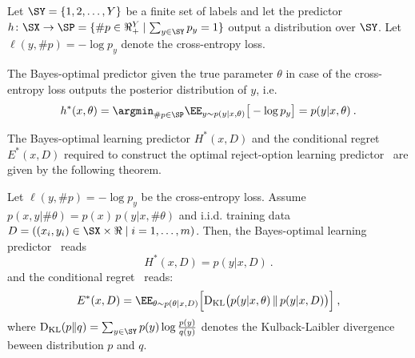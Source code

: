 Let $\SY=\{1,2,\ldots,Y\}$ be a finite set of labels and let the predictor $h\colon\SX\rightarrow \SP=\{\#p\in\Re_+^Y\mid \sum_{y\in\SY}p_y=1\}$ output a distribution over $\SY$. Let $\ell(y,\#p)=-\log p_y$ denote the cross-entropy loss. 

The Bayes-optimal predictor given the true parameter $\theta$ in case of the cross-entropy loss outputs the posterior distribution of $y$, i.e.
\[
   h^*(x,\theta) = \argmin_{\#p\in\SP} \EE_{y\sim p(y|x,\theta)} \big [-\log p_y \big ] = p(y|x,\theta) \:.
\]
%

The Bayes-optimal learning predictor $H^*(x,D)$ and the conditional regret $E^*(x,D)$ required to construct the optimal reject-option learning predictor~ are given by the following theorem.

\begin{theorem}
Let $\ell(y,\#p)=-\log p_y$ be the cross-entropy loss. 
Assume $p(x,y|\#\theta)=p(x)\,p(y|x,\#\theta)$ and i.i.d. training data $D=((x_i,y_i)\in\SX\times\Re\mid i=1,\ldots,m)$. Then, the Bayes-optimal learning predictor~ reads
\[
   H^*(x,D) = p(y|x,D)\:.
\]
and the conditional regret~ reads:
\begin{equation}
  \label{equ:CondRegretEntropy}
   E^*(x,D) = \EE_{\theta\sim p(\theta|x,D)} \Big [{\rm D}_{\rm KL}\big (p(y|x,\theta)\, \|\, p(y|x,D)\big ) \Big ]
   \:,
\end{equation}
%
where ${\rm D}_{\rm KL}(p\| q)=\sum_{y\in\SY} p(y)\log \frac{p(y)}{q(y)}$ denotes the Kulback-Laibler divergence beween distribution $p$ and $q$.

\end{theorem}
